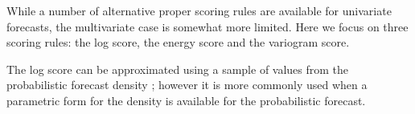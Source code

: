 \documentclass[12pt]{article}
\def\E{\text{E}}
\theoremstyle{definition}
\begin{document}
While a number of alternative proper scoring rules are available for univariate forecasts, the multivariate case is somewhat more limited. Here we focus on three scoring rules: the log score, the energy score and the variogram score. %
%

The log score can be approximated using a sample of values from the probabilistic forecast density \citep{Jordan2017}; however it is more commonly used when a parametric form for the density is available for the probabilistic forecast.
\end{document}
